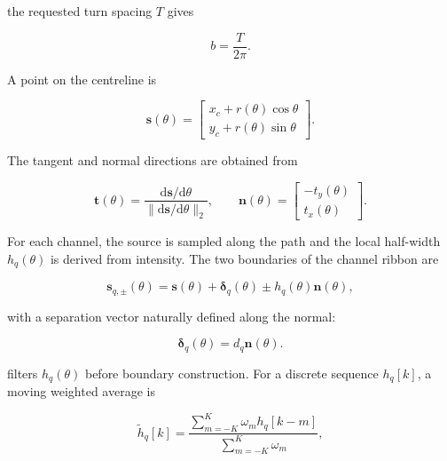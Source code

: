 the requested turn spacing $T$ gives

\begin{equation}
b=\frac{T}{2\pi}.
\label{eq:spiralb}
\end{equation}

A point on the centreline is

\begin{equation}
\mathbf{s}(\theta)=
\begin{bmatrix}
x_c+r(\theta)\cos\theta\\[1mm]
y_c+r(\theta)\sin\theta
\end{bmatrix}.
\label{eq:spiralparam}
\end{equation}

The tangent and normal directions are obtained from

\begin{equation}
\mathbf{t}(\theta)=
\frac{\mathrm{d}\mathbf{s}/\mathrm{d}\theta}
{\|\mathrm{d}\mathbf{s}/\mathrm{d}\theta\|_2},
\qquad
\mathbf{n}(\theta)=
\begin{bmatrix}-t_y(\theta)\\t_x(\theta)\end{bmatrix}.
\label{eq:spiralnormal}
\end{equation}

For each channel, the source is sampled along the path and the local half-width $h_q(\theta)$ is derived from intensity. The two boundaries of the channel ribbon are

\begin{equation}
\mathbf{s}_{q,\pm}(\theta)=
\mathbf{s}(\theta)+\boldsymbol{\delta}_q(\theta)
\pm h_q(\theta)\mathbf{n}(\theta),
\label{eq:spiralboundaries}
\end{equation}

with a separation vector naturally defined along the normal:

\begin{equation}
\boldsymbol{\delta}_q(\theta)=d_q\mathbf{n}(\theta).
\end{equation}

 filters $h_q(\theta)$ before boundary construction. For a discrete sequence $h_q[k]$, a moving weighted average is

\begin{equation}
\widetilde{h}_q[k]=
\frac{\displaystyle\sum_{m=-K}^{K}\omega_m h_q[k-m]}
{\displaystyle\sum_{m=-K}^{K}\omega_m},
\label{eq:pathsmooth}
\end{equation}


